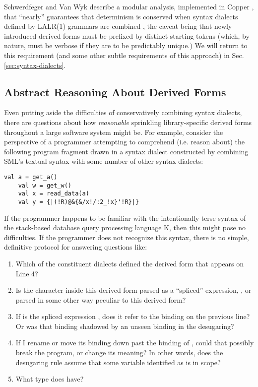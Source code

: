 Schwerdfeger and Van Wyk describe a modular analysis, implemented in Copper \cite{conf/gpce/WykS07}, that ``nearly'' guarantees that determinism is conserved when syntax dialects defined by LALR(1) grammars are combined \cite{conf/pldi/SchwerdfegerW09}, the caveat being that newly introduced derived forms must be prefixed by distinct starting tokens (which, by nature, must be verbose if they are to be predictably unique.) We will return to this requirement (and some other subtle requirements of this approach) in Sec. \ref{sec:syntax-dialects}.


\subsection{Abstract Reasoning About Derived Forms}\label{sec:abs-reasoning-intro}
Even putting aside the difficulties of conservatively combining syntax dialects, there are questions about how \emph{reasonable} sprinkling library-specific derived forms throughout a large software system might be. 
For example, consider the perspective of a programmer attempting to comprehend (i.e. reason about) the following program fragment drawn in a syntax dialect constructed by combining SML's textual syntax with some number of other syntax dialects:
\begin{lstlisting}[numbers=none]
    val a = get_a()
    val w = get_w()
    val x = read_data(a)
    val y = {|(!R)@&{&/x!/:2_!x}'!R}|}
\end{lstlisting}

If the programmer happens to be familiar with the intentionally terse syntax of the stack-based database query processing language K, then this might pose no difficulties. If the programmer does not recognize this syntax, there is no simple, definitive protocol for answering questions like:

\begin{enumerate}
\item Which of the constituent dialects defined the derived form that appears on Line 4?
\item Is the character  inside this derived form parsed as a ``spliced'' expression, , or parsed in some other way peculiar to this derived form?
\item If  is the spliced expression , does it refer to the binding on the previous line? Or was that binding shadowed by an unseen binding in the desugaring?
\item If I rename  or move its binding down past the binding of , could that possibly break the program, or change its meaning? In other words, does the desugaring rule assume that some variable identified as  is in scope?
\item What type does  have?
\end{enumerate}

